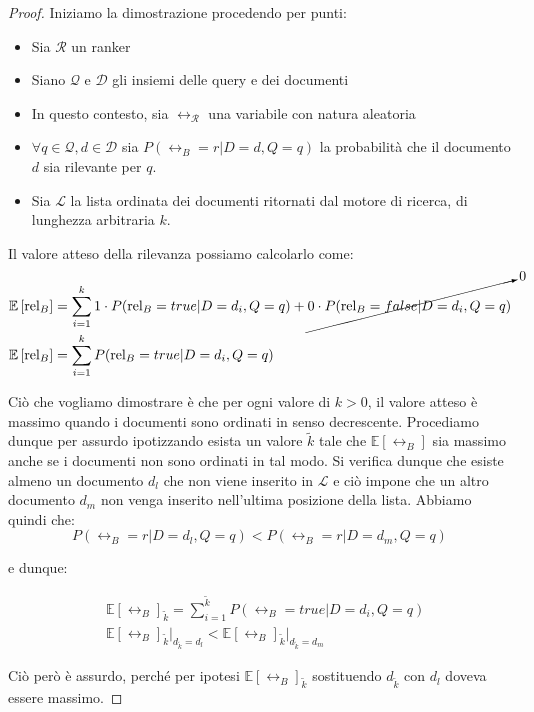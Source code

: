 \begin{proof}
	Iniziamo la dimostrazione procedendo per punti:
	\begin{itemize}
		\item Sia $\mathcal{R}$ un ranker
		\item Siano $\mathcal{Q}$ e $\mathcal{D}$ gli insiemi delle query e dei documenti
		\item In questo contesto, sia $\rel_\mathcal{R}$ una variabile con natura aleatoria
		\item $\forall{q \in \mathcal{Q}, d \in \mathcal{D}}$ sia $P(\rel_B = r  | D = d, Q = q )$
		la probabilità che il documento $d$ sia rilevante per $q$.
		\item Sia $\mathcal{L}$  la lista ordinata dei documenti ritornati dal motore di ricerca, di lunghezza arbitraria
		$k$.
	\end{itemize}
	
	Il valore atteso della rilevanza possiamo calcolarlo come:
	\begin{align*}
	& \mathbb{E}\left[\text{rel}_B\right] = \sum_{i=1}^{k}{
		1 \cdot P(\text{rel}_B = true  | D = d_i, Q = q ) + \cancelto{0}{0 \cdot  P(\text{rel}_B = false  | D = d_i, Q = q )}
	} \\
	& \mathbb{E}\left[\text{rel}_B\right] = \sum_{i=1}^{k}{P(\text{rel}_B = true  | D = d_i, Q = q )}
	\end{align*}
	
	Ciò che vogliamo dimostrare è che per ogni valore di $k>0$, il valore atteso è massimo quando i documenti
	sono ordinati in senso decrescente.
	Procediamo dunque per assurdo ipotizzando esista un valore $\tilde{k}$ tale che $\mathbb{E}[\rel_B]$ sia
	massimo anche se i documenti non sono ordinati in tal modo.
	Si verifica dunque che esiste almeno un documento $d_l$ che non viene inserito in $\mathcal{L}$ e
 ciò impone che un altro documento $d_m$ non venga inserito nell'ultima posizione della lista.
	Abbiamo quindi che:
	$$
	P(\rel_B = r | D = d_l, Q=q)  < P(\rel_B = r| D = d_m, Q = q)
	$$
	
	e dunque:
	
	\begin{align*}
	& \mathbb{E}\left[\rel_B\right]_{\tilde{k}} = \sum_{i=1}^{\tilde{k}}{P(\rel_B = true | D = d_i, Q = q)} \\
	& \mathbb{E}[\rel_B]_{\tilde{k}} \Big|_{d_{\tilde{k}} = d_{l}} < \mathbb{E}[\rel_B]_{\tilde{k}} \Big|_{d_{\tilde{k}} = d_{m}}
	\end{align*}
	
	Ciò però è assurdo, perché per ipotesi $\mathbb{E}\left[\rel_B\right]_{\tilde{k}}$ sostituendo $d_{\tilde{k}}$ con $d_l$ doveva
	essere massimo.
\end{proof}

